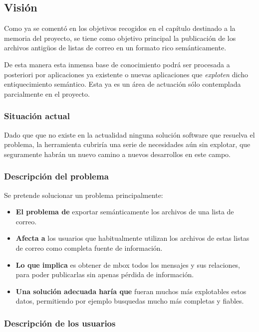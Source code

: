 
\subsection{Visión}

Como ya se comentó en los objetivos recogidos en el capítulo destinado a
la memoria del proyecto, se tiene como objetivo principal la publicación 
de los archivos antigüos de listas de correo en un formato rico 
semánticamente.

De esta manera esta inmensa base de conocimiento podrá ser procesada a 
posteriori por aplicaciones ya existente o nuevas aplicaciones que 
\emph{exploten} dicho entiquecimiento semántico. Esta ya es un área de 
actuación sólo contemplada parcialmente en el proyecto.

\subsubsection{Situación actual}

Dado que que no existe en la actualidad ninguna solución software que
resuelva el problema, la herramienta cubriría una serie de necesidades
aún sin explotar, que seguramente habrán un nuevo camino a nuevos 
desarrollos en este campo.

\subsubsection{Descripción del problema}

Se pretende solucionar un problema principalmente:

\begin{itemize}
  \item \textbf{El problema de} exportar semánticamente los archivos 
	de una lista de correo.
  \item \textbf{Afecta a} los usuarios que habitualmente utilizan los 
	archivos de estas listas de correo como completa fuente de 
	información.
  \item \textbf{Lo que implica} es obtener de mbox todos los mensajes 
	y sus relaciones, para poder publicarlas sin apenas pérdida de
	información.
  \item \textbf{Una solución adecuada haría que} fueran muchos más
	explotables estos datos, permitiendo por ejemplo busquedas
	mucho más completas y fiables.
\end{itemize}

\subsubsection{Descripción de los usuarios}

